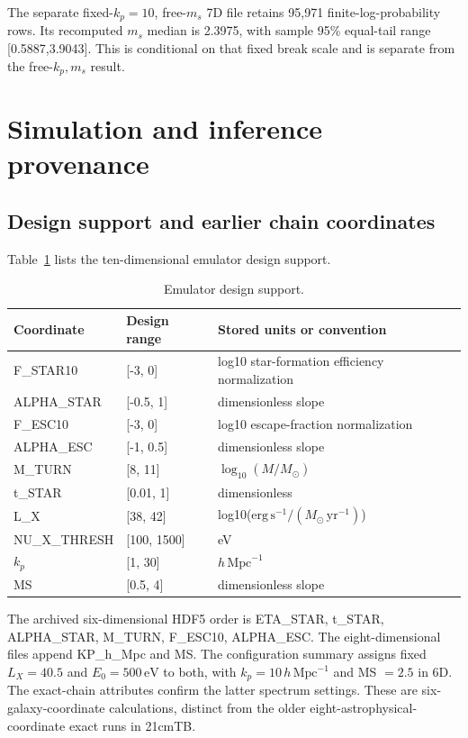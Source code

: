 The separate fixed-$k_p=10$, free-$m_s$ 7D file retains 95,971 finite-log-probability rows. Its recomputed $m_s$ median is 2.3975, with sample 95\% equal-tail range [0.5887,3.9043]. This is conditional on that fixed break scale and is separate from the free-$k_p,m_s$ result.

\section{Simulation and inference provenance}\label{app:provenance}

\subsection{Design support and earlier chain coordinates}\label{parameter-domain-and-chain-definitions}

Table~\ref{tab:parameters} lists the ten-dimensional emulator design support.

\begin{table}[t]
\caption{Emulator design support.}
\label{tab:parameters}
\centering\small
\begin{tabular}{p{}p{}p{}}
\toprule
Coordinate & Design range & Stored units or convention \\
\midrule
F\_STAR10 & {[}-3, 0{]} & log10 star-formation efficiency normalization \\
ALPHA\_STAR & {[}-0.5, 1{]} & dimensionless slope \\
F\_ESC10 & {[}-3, 0{]} & log10 escape-fraction normalization \\
ALPHA\_ESC & {[}-1, 0.5{]} & dimensionless slope \\
M\_TURN & {[}8, 11{]} & $\log_{10}(M/M_\odot)$ \\
t\_STAR & {[}0.01, 1{]} & dimensionless \\
L\_X & {[}38, 42{]} & log10($\mathrm{erg\,s^{-1}}/(M_\odot\,\mathrm{yr^{-1}})$) \\
NU\_X\_THRESH & {[}100, 1500{]} & eV \\
\ensuremath{k_p} & {[}1, 30{]} & $h\,\mathrm{Mpc}^{-1}$ \\
MS & {[}0.5, 4{]} & dimensionless slope \\
\bottomrule
\end{tabular}
\end{table}

The archived six-dimensional HDF5 order is ETA\_STAR, t\_STAR, ALPHA\_STAR, M\_TURN, F\_ESC10, ALPHA\_ESC. The eight-dimensional files append KP\_h\_Mpc and MS. The configuration summary assigns fixed $L_X=40.5$ and $E_0=500\,\mathrm{eV}$ to both, with $k_p=10\,h\,\mathrm{Mpc}^{-1}$ and MS $=2.5$ in 6D. The exact-chain attributes confirm the latter spectrum settings. These are six-galaxy-coordinate calculations, distinct from the older eight-astrophysical-coordinate exact runs in 21cmTB.

